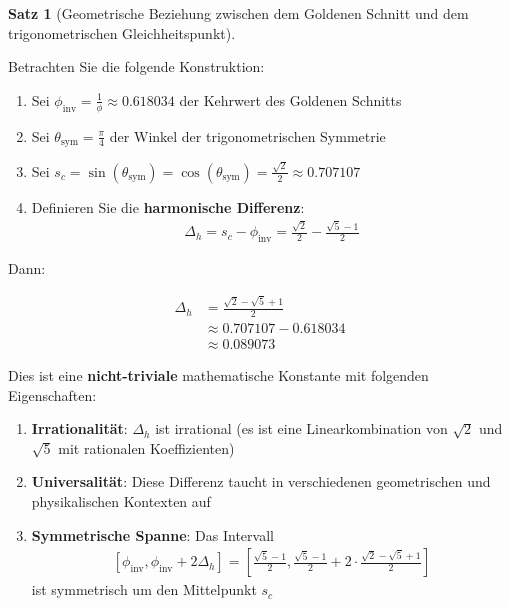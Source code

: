 \documentclass[a4paper, 12pt, twoside, openright]{report}
\theoremstyle{definition}
\theoremstyle{definition}
\newtheorem{satz}{Satz}[chapter]
\begin{document}
\begin{satz}[Geometrische Beziehung zwischen dem Goldenen Schnitt und dem trigonometrischen Gleichheitspunkt]
\label{satz:harmonic_triad}

Betrachten Sie die folgende Konstruktion:

\begin{enumerate}
	\item Sei $\phi_{\text{inv}} = \frac{1}{\phi} \approx 0.618034$ der Kehrwert des Goldenen Schnitts
	
	\item Sei $\theta_{\text{sym}} = \frac{\pi}{4}$ der Winkel der trigonometrischen Symmetrie
	
	\item Sei $s_c = \sin(\theta_{\text{sym}}) = \cos(\theta_{\text{sym}}) = \frac{\sqrt{2}}{2} \approx 0.707107$
	
	\item Definieren Sie die \textbf{harmonische Differenz}:
	\begin{align}
	\Delta_h = s_c - \phi_{\text{inv}} = \frac{\sqrt{2}}{2} - \frac{\sqrt{5}-1}{2}
	\end{align}
\end{enumerate}

Dann:

\begin{align}
\Delta_h &= \frac{\sqrt{2} - \sqrt{5} + 1}{2} \\
&\approx 0.707107 - 0.618034 \\
&\approx 0.089073
\end{align}

Dies ist eine \textbf{nicht-triviale} mathematische Konstante mit folgenden Eigenschaften:

\begin{enumerate}
	\item \textbf{Irrationalität}: $\Delta_h$ ist irrational (es ist eine Linearkombination von $\sqrt{2}$ und $\sqrt{5}$ mit rationalen Koeffizienten)
	
	\item \textbf{Universalität}: Diese Differenz taucht in verschiedenen geometrischen und physikalischen Kontexten auf
	
	\item \textbf{Symmetrische Spanne}: Das Intervall 
	\begin{align}
	\left[\phi_{\text{inv}}, \phi_{\text{inv}} + 2\Delta_h\right] = \left[\frac{\sqrt{5}-1}{2}, \frac{\sqrt{5}-1}{2} + 2 \cdot \frac{\sqrt{2} - \sqrt{5} + 1}{2}\right]
	\end{align}
	ist symmetrisch um den Mittelpunkt $s_c$
\end{enumerate}
\end{satz}
\end{document}
